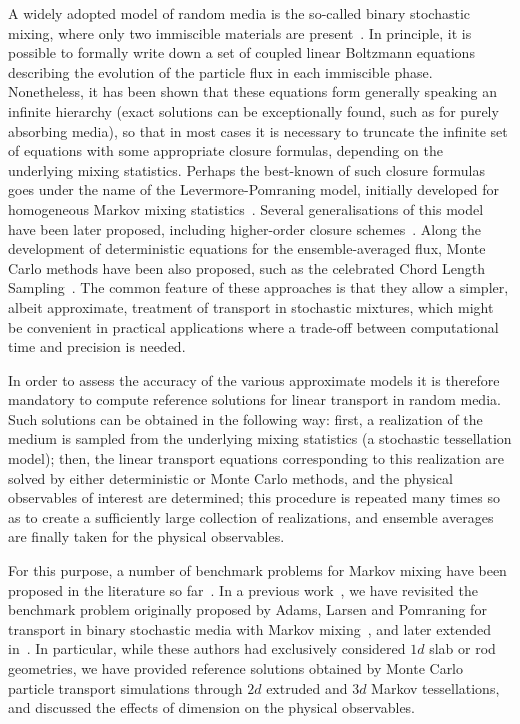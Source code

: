 \documentclass[final,authoryear,5p,times,twocolumn]{elsarticle}
\begin{document}
A widely adopted model of random media is the so-called binary stochastic mixing, where only two immiscible materials are present~\cite{pomraning}. In principle, it is possible to formally write down a set of coupled linear Boltzmann equations describing the evolution of the particle flux in each immiscible phase. Nonetheless, it has been shown that these equations form generally speaking an infinite hierarchy (exact solutions can be exceptionally found, such as for purely absorbing media), so that in most cases it is necessary to truncate the infinite set of equations with some appropriate closure formulas, depending on the underlying mixing statistics. Perhaps the best-known of such closure formulas goes under the name of the Levermore-Pomraning model, initially developed for homogeneous Markov mixing statistics~\cite{pomraning, levermore}. Several generalisations of this model have been later proposed, including higher-order closure schemes~\cite{pomraning, su}. Along the development of deterministic equations for the ensemble-averaged flux, Monte Carlo methods have been also proposed, such as the celebrated Chord Length Sampling~\cite{zimmerman, zimmerman_adams, sutton, donovan}. The common feature of these approaches is that they allow a simpler, albeit approximate, treatment of transport in stochastic mixtures, which might be convenient in practical applications where a trade-off between computational time and precision is needed.

In order to assess the accuracy of the various approximate models it is therefore mandatory to compute reference solutions for linear transport in random media. Such solutions can be obtained in the following way: first, a realization of the medium is sampled from the underlying mixing statistics (a stochastic tessellation model); then, the linear transport equations corresponding to this realization are solved by either deterministic or Monte Carlo methods, and the physical observables of interest are determined; this procedure is repeated many times so as to create a sufficiently large collection of realizations, and ensemble averages are finally taken for the physical observables.

For this purpose, a number of benchmark problems for Markov mixing have been proposed in the literature so far~\cite{benchmark_adams, renewal, brantley_benchmark, brantley_conf, brantley_conf_2, vasques_suite2}. In a previous work~\cite{larmier_benchmark}, we have revisited the benchmark problem originally proposed by Adams, Larsen and Pomraning for transport in binary stochastic media with Markov mixing~\cite{benchmark_adams}, and later extended in~\cite{brantley_benchmark, brantley_conf, brantley_conf_2, vasques_suite2}. In particular, while these authors had exclusively considered $1d$ slab or rod geometries, we have provided reference solutions obtained by Monte Carlo particle transport simulations through $2d$ extruded and $3d$ Markov tessellations, and discussed the effects of dimension on the physical observables.
\end{document}
